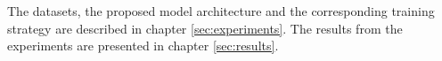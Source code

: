 The datasets, the proposed model architecture and the corresponding training strategy are described in chapter \ref{sec:experiments}. The results from the experiments are presented in chapter \ref{sec:results}. 
\begin{comment}
\section{Signals used for PHM}
In the work of Pandhare et al. \cite{Pandhare2021} just vibration signals in different spatial directions are measured with sensors, installed at various locations on the BSD. Azamfar et al. \cite{AZAMFAR2020103932} additionally use sound pressure sensors to capture the acoustic level and extract torque and speed signals from the controller. In this thesis also the mechanical power, target electrical power and actual electrical power signals were extracted from the controller. Pandhare et al. and Azamfar et al. record machine data during BSD steady-state motion. In this thesis machine data is collected during different machine excitements (constant speed excitements, direction change excitements and sweep excitement) along the machine tools X-axis. These different signals were evaluated for their suitability for PHM of BSDs


Both Pandhare et al. \cite{Pandhare2021} and Azamfar et al. \cite{AZAMFAR2020103932} feed the data recorded during BSD steady-state motion as one single input to their models. During the phases of constant BSD motion, the amplitude of the signals changess. Azamfar et al. assume that the shorter sequences created by a windowing function just capture limited information about these changes and are therefore not a proper tool for PHM \cite{AZAMFAR2020103932}. In the thesis a windowing function was evaluated for the PHM of BSDs. Windowing functions make the BSD experiments less dependent from specific BSD excitements. When beeing able to check the BSD degradation with short recorded windows, one can make statements about the BSD health status with data redcorded in real time use. Extra experiments 
\end{comment}


